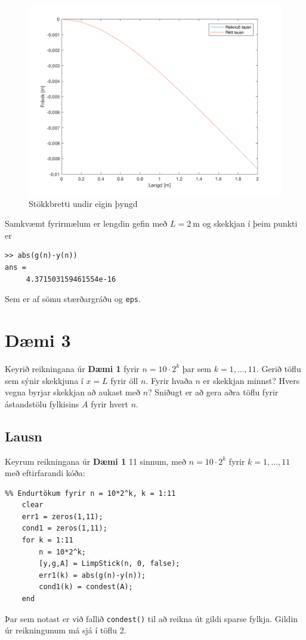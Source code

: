 \documentclass[11pt]{article}
\begin{document}
{\begin{figure}[H]
\centering
\includegraphics[scale=0.3]{bretti.png}
\caption{Stökkbretti undir eigin þyngd}
\end{figure}
Samkvæmt fyrirmælum er lengdin gefin með $L=\SI{2}{\meter}$ og skekkjan í þeim punkti er
\begin{verbatim}
>> abs(g(n)-y(n))
ans =
     4.371503159461554e-16
\end{verbatim}
Sem er af sömu stærðargráðu og \texttt{eps}.


\newpage
\section*{Dæmi 3}

Keyrið reikningana úr \textbf{Dæmi 1} fyrir $n=10\cdot2^k$ þar sem $k=1,\dots,11$. Gerið töflu sem sýnir skekkjuna í $x = L$ fyrir öll $n$. Fyrir hvaða $n$ er skekkjan minnst? Hvers vegna byrjar skekkjan að aukast með $n$? Sniðugt er að gera aðra töflu fyrir ástandstölu fylkisins $A$ fyrir hvert $n$.

\subsection*{Lausn}

Keyrum reikningana úr \textbf{Dæmi 1} 11 sinnum, með $n = 10\cdot2^k$ fyrir $k = 1,\dots,11$ með eftirfarandi kóða:
\begin{verbatim}
%% Endurtökum fyrir n = 10*2^k, k = 1:11
    clear
    err1 = zeros(1,11);
    cond1 = zeros(1,11);
    for k = 1:11
        n = 10*2^k;
        [y,g,A] = LimpStick(n, 0, false);
        err1(k) = abs(g(n)-y(n));
        cond1(k) = condest(A);
    end
\end{verbatim}
Þar sem notast er við fallið \texttt{condest()} til að reikna út gildi sparse fylkja. Gildin úr reikningunum má sjá í töflu 2.

}
\end{document}

